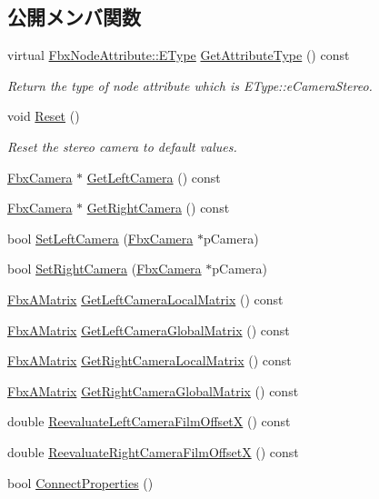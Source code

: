\subsection*{公開メンバ関数}
\begin{DoxyCompactItemize}
\item 
virtual \hyperlink{class_fbx_node_attribute_a08e1669d3d1a696910756ab17de56d6a}{Fbx\+Node\+Attribute\+::\+E\+Type} \hyperlink{class_fbx_camera_stereo_a19160f0fdeaf5407d2bc9c1608f6af53}{Get\+Attribute\+Type} () const
\begin{DoxyCompactList}\small\item\em Return the type of node attribute which is E\+Type\+::e\+Camera\+Stereo. \end{DoxyCompactList}\item 
void \hyperlink{class_fbx_camera_stereo_a5c693025d4b4d25ea05bec61f2c25cd8}{Reset} ()
\begin{DoxyCompactList}\small\item\em Reset the stereo camera to default values. \end{DoxyCompactList}\item 
\hyperlink{class_fbx_camera}{Fbx\+Camera} $\ast$ \hyperlink{class_fbx_camera_stereo_a6841f71c09bdd63c7e936cdb23e818e9}{Get\+Left\+Camera} () const
\item 
\hyperlink{class_fbx_camera}{Fbx\+Camera} $\ast$ \hyperlink{class_fbx_camera_stereo_a8c293c596ad0c3b9fb169bdf5b508a68}{Get\+Right\+Camera} () const
\item 
bool \hyperlink{class_fbx_camera_stereo_a3f6d9d09dd4ec6f9fe1b1b829f26a11f}{Set\+Left\+Camera} (\hyperlink{class_fbx_camera}{Fbx\+Camera} $\ast$p\+Camera)
\item 
bool \hyperlink{class_fbx_camera_stereo_a9b37a67b3bf1e94a6845077913083d78}{Set\+Right\+Camera} (\hyperlink{class_fbx_camera}{Fbx\+Camera} $\ast$p\+Camera)
\item 
\hyperlink{class_fbx_a_matrix}{Fbx\+A\+Matrix} \hyperlink{class_fbx_camera_stereo_aba407c7661b66bc57690534a7aaf445e}{Get\+Left\+Camera\+Local\+Matrix} () const
\item 
\hyperlink{class_fbx_a_matrix}{Fbx\+A\+Matrix} \hyperlink{class_fbx_camera_stereo_afca8a70331c5a524ad7c790e8c52af77}{Get\+Left\+Camera\+Global\+Matrix} () const
\item 
\hyperlink{class_fbx_a_matrix}{Fbx\+A\+Matrix} \hyperlink{class_fbx_camera_stereo_a111785c11520b456bb43ed6701eaa84d}{Get\+Right\+Camera\+Local\+Matrix} () const
\item 
\hyperlink{class_fbx_a_matrix}{Fbx\+A\+Matrix} \hyperlink{class_fbx_camera_stereo_ae46b1246ccc65e2cb3e76cc3673172fd}{Get\+Right\+Camera\+Global\+Matrix} () const
\item 
double \hyperlink{class_fbx_camera_stereo_a372e001c8d6f950d787831dc57c5fc20}{Reevaluate\+Left\+Camera\+Film\+OffsetX} () const
\item 
double \hyperlink{class_fbx_camera_stereo_a63526f13544a343e4447d4567a88bf9d}{Reevaluate\+Right\+Camera\+Film\+OffsetX} () const
\item 
bool \hyperlink{class_fbx_camera_stereo_a00d710d453a4cad2f7f93199ff68ee17}{Connect\+Properties} ()
\end{DoxyCompactItemize}
